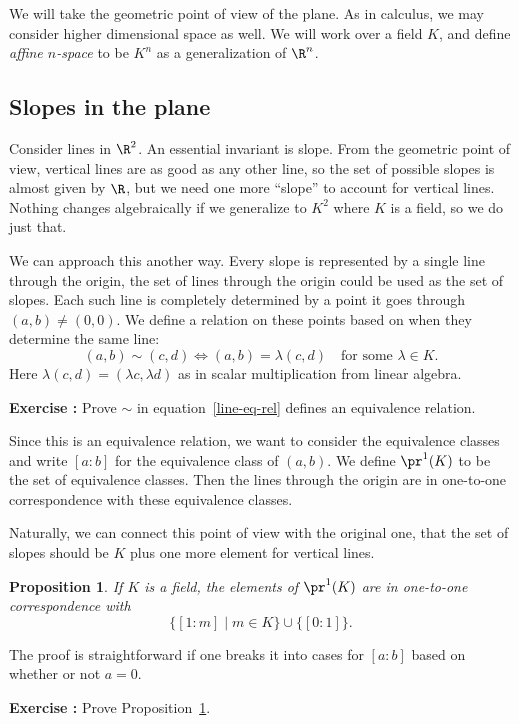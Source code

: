\documentclass[12pt]{amsart}
\newcounter{probs}
\newenvironment{prob}{%
  \refstepcounter{probs}
  \par\medskip\noindent\textbf{Exercise \theprobs:} }{\par\medskip}
\theoremstyle{plain}
\newtheorem{prop}[thm]{Proposition}
\theoremstyle{definition}
\theoremstyle{remark}
\begin{document}
We will take the geometric point of view of the plane.  As in
calculus, we may consider higher dimensional space as well.  We will
work over a field $K$, and define \emph{affine $n$-space} to be $K^n$
as a generalization of $\R^n$.

\subsection{Slopes in the plane}
Consider lines in $\R^2$.  An essential invariant is slope.
From the geometric point of view, vertical lines are as good as any
other line, so the set of possible slopes is almost given by $\R$, but
we need one more ``slope'' to account for vertical lines.  Nothing
changes algebraically if we generalize to $K^2$ where $K$ is a field,
so we do just that.

We can approach this another way.  Every slope is represented by a
single line through the origin, the set of lines through the
origin could be used as the set of slopes.  Each such line is
completely determined by a point it goes through $(a,b)\neq (0,0)$.
We define a relation on these points based on when they determine the
same line:
\begin{equation} \label{line-eq-rel}
 (a,b)\sim (c,d) \iff (a,b)=\lambda (c,d)\quad\text{for some
  $\lambda\in K$.}
\end{equation}
Here $\lambda(c,d)= (\lambda c, \lambda d)$ as in scalar
multiplication from linear algebra.
\begin{prob}
  Prove $\sim$ in equation~\eqref{line-eq-rel} defines an equivalence
  relation.
\end{prob}
Since this is an equivalence relation, we want to consider the
equivalence classes and write $[a:b]$ for the
equivalence class of $(a,b)$.  We define $\pr^1(K)$ to be the set of
equivalence classes.  Then the lines through the origin are
in one-to-one correspondence with these equivalence classes.

Naturally, we can connect this point of view with the original one,
that the set of slopes should be $K$ plus one more element for
vertical lines.
\begin{prop}\label{p1}
  If $K$ is a field, the elements of $\pr^1(K)$ are in one-to-one
  correspondence with
  \[ \{[1:m]\mid m\in K\}\cup \{[0:1]\}.\]
\end{prop}
The proof is straightforward if one breaks it into cases for $[a:b]$
based on whether or not $a=0$.
\begin{prob}
  Prove Proposition~\ref{p1}.
\end{prob}
\end{document}
